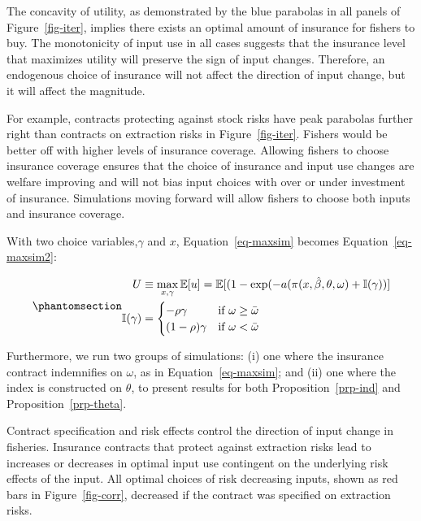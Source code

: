 \documentclass[
  letterpaper,
  DIV=11,
  numbers=noendperiod]{scrartcl}
\theoremstyle{plain}
\theoremstyle{plain}
\theoremstyle{remark}
\begin{document}
The concavity of utility, as demonstrated by the blue parabolas in all
panels of Figure~\ref{fig-iter}, implies there exists an optimal amount
of insurance for fishers to buy. The monotonicity of input use in all
cases suggests that the insurance level that maximizes utility will
preserve the sign of input changes. Therefore, an endogenous choice of
insurance will not affect the direction of input change, but it will
affect the magnitude.

For example, contracts protecting against stock risks have peak
parabolas further right than contracts on extraction risks in
Figure~\ref{fig-iter}. Fishers would be better off with higher levels of
insurance coverage. Allowing fishers to choose insurance coverage
ensures that the choice of insurance and input use changes are welfare
improving and will not bias input choices with over or under investment
of insurance. Simulations moving forward will allow fishers to choose
both inputs and insurance coverage.

With two choice variables,\(\gamma\) and \(x\), Equation~\ref{eq-maxsim}
becomes Equation~\ref{eq-maxsim2}:

\begin{equation}\phantomsection\label{eq-maxsim2}{
\begin{aligned}
U&\equiv\max_{x,\gamma}\mathbb{E}[u]=\mathbb{E}[(1-\exp(-a(\pi(x,\hat\beta,\theta,\omega)+\mathbb{I}(\gamma))]\\
\mathbb{I}(\gamma)&=\begin{cases}-\rho\gamma & \text{if } \omega\ge \bar\omega\\
(1-\rho)\gamma & \text{if } \omega<\bar\omega
\end{cases}
\end{aligned}
}\end{equation}

Furthermore, we run two groups of simulations: (i) one where the
insurance contract indemnifies on \(\omega\), as in
Equation~\ref{eq-maxsim}; and (ii) one where the index is constructed on
\(\theta\), to present results for both Proposition~\ref{prp-ind} and
Proposition~\ref{prp-theta}.

Contract specification and risk effects control the direction of input
change in fisheries. Insurance contracts that protect against extraction
risks lead to increases or decreases in optimal input use contingent on
the underlying risk effects of the input. All optimal choices of risk
decreasing inputs, shown as red bars in Figure~\ref{fig-corr}, decreased
if the contract was specified on extraction risks.
\end{document}
